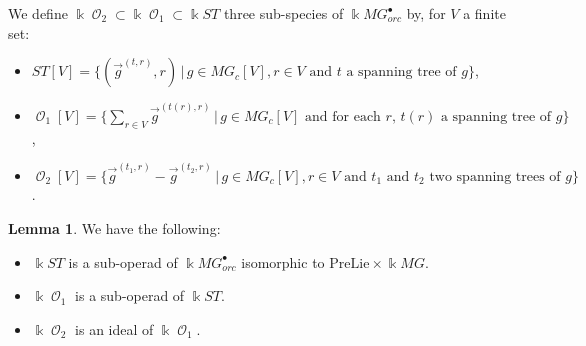 \documentclass[a4paper]{article}
\DeclareMathOperator{\op}{\mathcal{O}}
\theoremstyle{definition}
\newtheorem{lemma}[definition]{Lemma}
\begin{document}
We define $\Bbbk \op_2\subset \Bbbk\op_1\subset\Bbbk ST$ three sub-species of $\Bbbk MG_{orc}^{\bullet}$ by, for $V$ a finite set:
\begin{itemize}
\item $ST[V]=\{(\overrightarrow{g}^{(t,r)},r)\,|\,g\in MG_c[V], r\in V \text{ and $t$ a spanning tree of $g$}\}$,
\item $\op_1[V] = \{\sum_{r\in V} \overrightarrow{g}^{(t(r),r)}\,|\, g\in MG_c[V]\text{ and for each $r$, $t(r)$ a spanning tree of $g$}\}$,
\item $\op_2[V]=\{\overrightarrow{g}^{(t_1,r)}-\overrightarrow{g}^{(t_2,r)}\,|\,g\in MG_c[V],r\in V \text{ and $t_1$ and $t_2$ two spanning trees of $g$}\}$.
\end{itemize}

\begin{lemma}
\label{lemmfond}
We have the following:
\begin{itemize}
\item $\Bbbk ST$ is a sub-operad of $\Bbbk MG_{orc}^{\bullet}$ isomorphic to $\text{PreLie}\times \Bbbk MG$.
\item $\Bbbk \op_1$ is a sub-operad of $\Bbbk ST$.
\item $\Bbbk\op_2$ is an ideal of $\Bbbk\op_1$.
\end{itemize}
\end{lemma}
\end{document}
